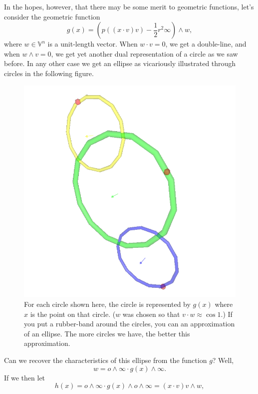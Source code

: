 \documentclass[12pt]{article}
\newcommand{\V}{\mathbb{V}}
\newcommand{\nvao}{o}
\newcommand{\nvai}{\infty}
\begin{document}
In the hopes, however, that there may be some merit to geometric functions, let's
consider the geometric function
\begin{equation*}
g(x)=\left(p((x\cdot v)v)-\frac{1}{2}r^2\nvai\right)\wedge w,
\end{equation*}
where $w\in\V^n$ is a unit-length vector.  When $w\cdot v=0$,
we get a double-line, and when $w\wedge v=0$, we get
yet another dual representation of a circle as we saw before.  In any other case
we get an ellipse as vicariously illustrated through circles in the following figure.
\begin{figure}[H]
\centering
\includegraphics[scale=0.3]{CirclesForEllipseFigure}
\caption{For each circle shown here, the circle is represented by $g(x)$ where $x$ is the point on that circle.
($w$ was chosen so that $v\cdot w\approx\cos 1$.)
If you put a rubber-band around the circles, you can an approximation of an ellipse.  The more circles we have,
the better this approximation.}
\label{fig_circles_of_ellipse}
\end{figure}
Can we recover the characteristics of this ellipse from
the function $g$?  Well,
\begin{equation*}
w=\nvao\wedge\nvai\cdot g(x)\wedge\nvai.
\end{equation*}
If we then let
\begin{equation*}
h(x)=\nvao\wedge\nvai\cdot g(x)\wedge\nvao\wedge\nvai=(x\cdot v)v\wedge w,
\end{equation*}
\end{document}

